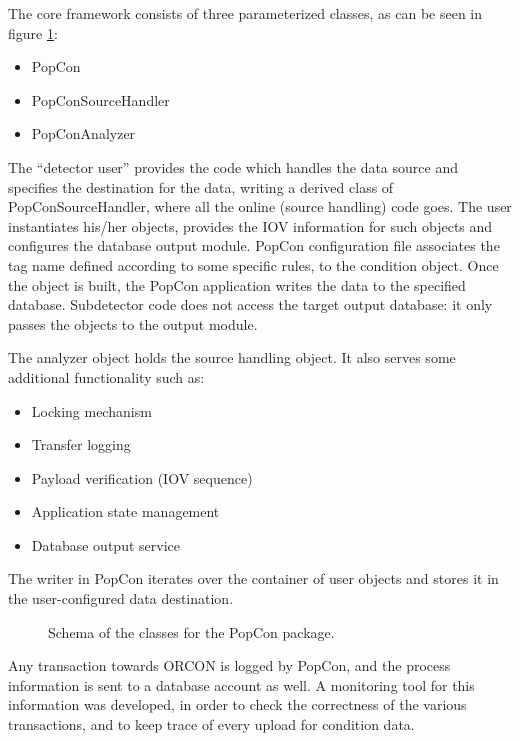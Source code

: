 \documentclass[a4paper]{jpconf}
\begin{document}
The core framework consists of three parameterized classes, as can be seen in figure \ref{fig:PopConSchema}:

\begin{itemize}
\item PopCon
\item PopConSourceHandler
\item PopConAnalyzer 
\end{itemize}

The ``detector user'' provides the code which handles the data source and specifies the destination for the data, writing a derived class of  PopConSourceHandler, where all the online (source handling) code goes. 
The user instantiates his/her objects, provides the IOV information for such objects and configures the database output module. 
PopCon configuration file associates the tag name defined according to some specific rules, to the condition object. 
Once the object is built, the PopCon application writes the data to the specified database. 
Subdetector code does not access the target output database: it only passes the objects to the output module.

The analyzer object holds the source handling object. It also serves some additional functionality such as:
\begin{itemize}
 \item Locking mechanism
 \item Transfer logging
 \item Payload verification (IOV sequence)
 \item Application state management
 \item Database output service 
\end{itemize}
The writer in PopCon iterates over the container of user objects and stores it in the user-configured data destination. 

\begin{figure}[hbtp]
  \begin{center}
     \caption{Schema of the classes for the PopCon package.}
    \label{fig:PopConSchema}
  \end{center}
\end{figure}

Any transaction towards ORCON is logged by PopCon, and the process information is sent to a database account as well. A monitoring tool for this information was developed, in order to check the correctness of the various transactions, and to keep trace of every upload for condition data.
 
\end{document}
